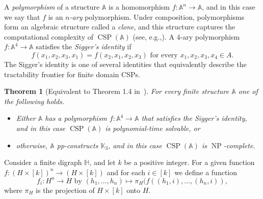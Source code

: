 \documentclass{article}
\newtheorem{theorem}{Theorem}
\theoremstyle{definition}
\theoremstyle{remark}
\DeclareMathOperator{\NP}{NP}
\DeclareMathOperator{\CSP}{CSP}
\newcommand{\bA}{{\mathbb A}}
\newcommand{\bH}{{\mathbb H}}
\newcommand{\bK}{{\mathbb K}}
\begin{document}
A \emph{polymorphism} of a structure $\bA$ is a homomorphism $f\colon \bA^n\to \bA$, and in 
this case we say that $f$ is an \emph{$n$-ary} polymorphism. Under composition, polymorphisms
form an algebraic structure called a \emph{clone}, and this structure captures the
computational complexity of $\CSP(\bA)$ (see, e.g.,\cite{Pol}). A $4$-ary polymorphism
$f\colon \bA^4\to \bA$ satisfies the \emph{Sigger's identity} if 
\[
    f(x_1,x_2,x_3,x_1) = f(x_2,x_1,x_2,x_3) \text{ for every } x_1,x_2,x_3,x_4\in A.
\]
The Sigger's identity is one of several identities that equivalently describe the tractability
frontier for finite domain CSPs.

\begin{theorem}
[Equivalent to Theorem 1.4 in~\cite{Zhuk20}]
\label{thm:finite-domain-dichotomy}
    For every finite structure $\bA$ one of the following holds.
    \begin{itemize}
        \item Either $\bA$ has a polymorphism $f\colon \bA^4\to \bA$ that satisfies the
        Sigger's identity, and in this case $\CSP(\bA)$ is polynomial-time solvable, or
        \item otherwise, $\bA$ pp-constructs $\bK_3$, and in this case $\CSP(\bA)$ is $\NP$-complete.
    \end{itemize}
\end{theorem}


Consider a finite digraph $\bH$, and let $k$ be a positive integer. For a given function 
$f\colon (H\times [k])^n\to (H\times [k])$ and for each $i\in [k]$ we define a function
\[
f_i\colon H^n\to H \text{ by } (h_1,\dots, h_n)\mapsto \pi_H(f((h_1,i),\dots, (h_n,i)),
\]
where $\pi_H$ is the projection of $H\times [k]$ onto $H$.
\end{document}
